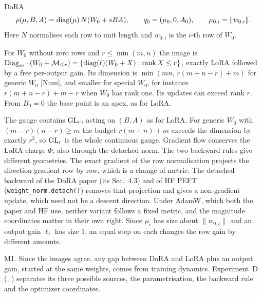 \begin{example*}{DoRA}\label{ex:dora}%
\[
  \rho(\mu,B,A)=\operatorname{diag}(\mu)\,N(W_0+sBA),\qquad q_0=(\mu_0,0,A_0),\qquad \mu_{0,i}=\lVert w_{0,i}\rVert.
\]
Here $N$ normalises each row to unit length and $w_{0,i}$ is the $i$-th row of $W_0$.
\begin{exVIIlines}
\item[Image] For $W_0$ without zero rows and $r\le\min(m,n)$ the image is
  $\mathrm{Diag}_m\cdot(W_0+\mathcal{M}_{\le r})=\{\operatorname{diag}(\ell)(W_0+X):\operatorname{rank} X\le r\}$, exactly LoRA followed by a free per-output gain.
  Its dimension is $\min(mn,\,r(m+n-r)+m)$ for generic $W_0$ [Num], and smaller for special $W_0$, for instance
  $r(m+n-r)+m-r$ when $W_0$ has rank one. Its updates can exceed rank $r$. From $B_0=0$ the base point is an apex, as
  for LoRA.
\item[Fibre] The gauge contains $\mathrm{GL}_r$, acting on $(B,A)$ as for LoRA. For generic $W_0$ with $(m-r)(n-r)\ge m$ the
  budget $r(m+n)+m$ exceeds the dimension by exactly $r^2$, so $\mathrm{GL}_r$ is the whole continuous gauge. Gradient flow
  conserves the LoRA charge $\Phi$, also through the detached norm. The two backward rules give different geometries.
  The exact gradient of the row normalisation projects the direction gradient row by row, which is a change of metric.
  The detached backward of the DoRA paper (its Sec.~4.3) and of HF PEFT (\texttt{weight\_norm.detach()}) removes that
  projection and gives a non-gradient update, which need not be a descent direction. Under AdamW, which both the paper
  and HF use, neither variant follows a fixed metric, and the magnitude coordinates matter in their own right. Since $\mu_i$
  has size about $\lVert w_{0,i}\rVert$ and an output gain $\ell_i$ has size $1$, an equal step on each changes the
  row gain by different amounts.
\item[Merge] M1. Since the images agree, any gap between DoRA and LoRA plus an output gain, started at the same
  weights, comes from training dynamics. Experiment~D (, ) separates
  its three possible sources, the parametrisation, the backward rule and the optimizer coordinates.
\end{exVIIlines}
\end{example*}

